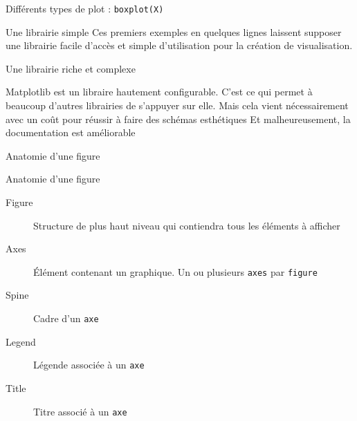 \begin{frame}{Différents types de plot : \texttt{boxplot(X)}}
    \begin{minipage}[t]{0.49\linewidth}
    \end{minipage}
    \begin{minipage}[t]{0.49\linewidth} 
        \vfill
    \end{minipage}
\end{frame}

\begin{frame}{Une librairie simple }
    Ces premiers exemples en quelques lignes laissent supposer une librairie facile d'accès et simple d'utilisation pour la création de visualisation.

\end{frame}

\begin{frame}{Une librairie riche et complexe}
    \begin{itemize}
        \positem Matplotlib est un libraire hautement configurable. C'est ce qui permet à beaucoup d'autres librairies de s'appuyer sur elle.
        \negitem Mais cela vient nécessairement avec un coût pour réussir à faire des schémas esthétiques
        \negitem Et malheureusement, la documentation est améliorable
    \end{itemize}
    
\end{frame}

\begin{frame}{Anatomie d'une figure}
\end{frame}

\begin{frame}{Anatomie d'une figure}
    \begin{minipage}{0.49\linewidth}
        \begin{description}
          \item[Figure] Structure de plus haut niveau qui contiendra tous les éléments à afficher
          \item[Axes] Élément contenant un graphique. Un ou plusieurs \texttt{axes} par \texttt{figure}
          \item[Spine] Cadre d'un \texttt{axe}
          \item[Legend] Légende associée à un \texttt{axe}
          \item[Title] Titre associé à un \texttt{axe}
      \end{description}
    \end{minipage}
    \begin{minipage}{0.49\linewidth}
    \end{minipage}
\end{frame}

